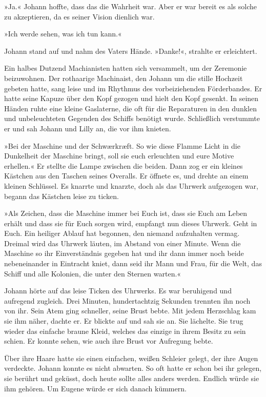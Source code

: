 »Ja.« Johann hoffte, dass das die Wahrheit war. Aber er war bereit
es als solche zu akzeptieren, da es seiner Vision dienlich war.

»Ich werde sehen, was ich tun kann.«

Johann stand auf und nahm des Vaters Hände. »Danke!«, strahlte er
erleichtert.

\tb

Ein halbes Dutzend Machianisten hatten sich versammelt, um der
Zeremonie beizuwohnen. Der rothaarige Machinaist, den Johann um die
stille Hochzeit gebeten hatte, sang leise und im Rhythmus des
vorbeiziehenden Förderbandes. Er hatte seine Kapuze über den Kopf
gezogen und hielt den Kopf gesenkt. In seinen Händen ruhte eine
kleine Gaslaterne, die oft für die Reparaturen in den dunklen und
unbeleuchteten Gegenden des Schiffs benötigt wurde. Schließlich
verstummte er und sah Johann und Lilly an, die vor ihm knieten.

»Bei der Maschine und der Schwærkræft. So wie diese Flamme Licht in
die Dunkelheit der Maschine bringt, soll sie euch erleuchten und
eure Motive erhellen.« Er stellte die Lampe zwischen die beiden.
Dann zog er ein kleines Kästchen aus den Taschen seines Overalls.
Er öffnete es, und drehte an einem kleinen Schlüssel. Es knarrte
und knarzte, doch als das Uhrwerk aufgezogen war, begann das
Kästchen leise zu ticken.

»Als Zeichen, dass die Maschine immer bei Euch ist, dass sie Euch
am Leben erhält und dass sie für Euch sorgen wird, empfangt nun
dieses Uhrwerk. Geht in Euch. Ein heiliger Ablauf hat begonnen, den
niemand aufzuhalten vermag. Dreimal wird das Uhrwerk läuten, im
Abstand von einer Minute. Wenn die Maschine so ihr Einverständnis
gegeben hat und ihr dann immer noch beide nebeneinander in
Eintracht kniet, dann seid ihr Mann und Frau, für die Welt, das
Schiff und alle Kolonien, die unter den Sternen warten.«

Johann hörte auf das leise Ticken des Uhrwerks. Es war beruhigend
und aufregend zugleich. Drei Minuten, hundertachtzig Sekunden
trennten ihn noch von ihr. Sein Atem ging schneller, seine Brust
bebte. Mit jedem Herzschlag kam sie ihm näher, dachte er. Er
blickte auf und sah sie an. Sie lächelte. Sie trug wieder das
einfache braune Kleid, welches das einzige in ihrem Besitz zu sein
schien. Er konnte sehen, wie auch ihre Brust vor Aufregung bebte.

Über ihre Haare hatte sie einen einfachen, weißen Schleier gelegt,
der ihre Augen verdeckte. Johann konnte es nicht abwarten. So oft
hatte er schon bei ihr gelegen, sie berührt und geküsst, doch heute
sollte alles anders werden. Endlich würde sie ihm gehören. Um
Eugene würde er sich danach kümmern.

